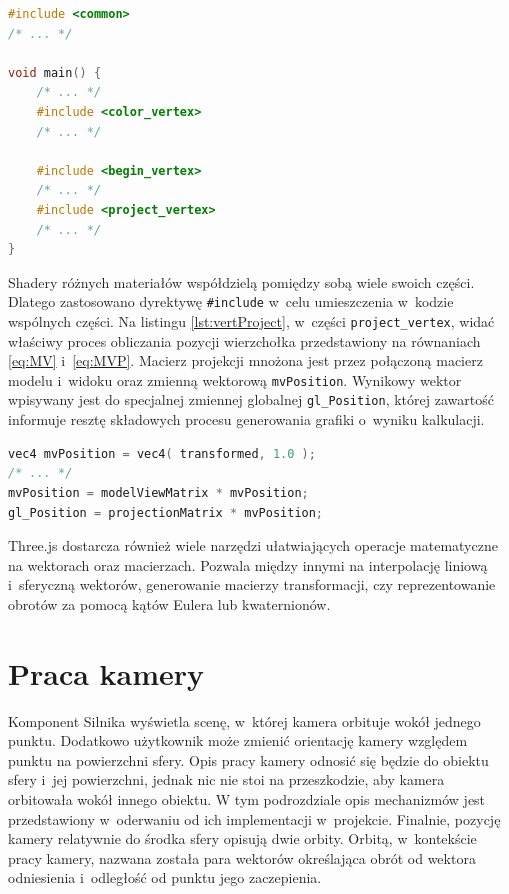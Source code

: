 \begin{lstlisting}[language=C++, label={lst:matVert}, caption={
    Fragmenty vertex shadera materiału \texttt{MeshBasicMaterial}}
]
#include <common>
/* ... */

void main() {
    /* ... */
	#include <color_vertex>
    /* ... */

	#include <begin_vertex>
	/* ... */
	#include <project_vertex>
	/* ... */
}
\end{lstlisting}

Shadery różnych materiałów współdzielą pomiędzy sobą wiele swoich części. Dlatego zastosowano dyrektywę \texttt{\#include} w~celu umieszczenia w~kodzie wspólnych części. Na listingu \ref{lst:vertProject}, w~części \texttt{project\_vertex}, widać właściwy proces obliczania pozycji wierzchołka przedstawiony na równaniach \ref{eq:MV} i~\ref{eq:MVP}. Macierz projekcji mnożona jest przez połączoną macierz modelu i~widoku oraz zmienną wektorową \texttt{mvPosition}. Wynikowy wektor wpisywany jest do specjalnej zmiennej globalnej \texttt{gl\_Position}, której zawartość informuje resztę składowych procesu generowania grafiki o~wyniku kalkulacji. 

\begin{lstlisting}[language=C++, label={lst:vertProject}, caption={
    Fragmenty części \texttt{project\_vertex} vertex shadera}
]
vec4 mvPosition = vec4( transformed, 1.0 );
/* ... */
mvPosition = modelViewMatrix * mvPosition;
gl_Position = projectionMatrix * mvPosition;
\end{lstlisting}

Three.js dostarcza również wiele narzędzi ułatwiających operacje matematyczne na wektorach oraz macierzach. Pozwala między innymi na interpolację liniową i~sferyczną wektorów, generowanie macierzy transformacji, czy reprezentowanie obrotów za pomocą kątów Eulera lub kwaternionów.

\section{Praca kamery}

Komponent Silnika wyświetla scenę, w~której kamera orbituje wokół jednego punktu. Dodatkowo użytkownik może zmienić orientację kamery względem punktu na powierzchni sfery. Opis pracy kamery odnosić się będzie do obiektu sfery i~jej powierzchni, jednak nic nie stoi na przeszkodzie, aby kamera orbitowała wokół innego obiektu. W tym podrozdziale opis mechanizmów jest przedstawiony w~oderwaniu od ich implementacji w~projekcie. Finalnie, pozycję kamery relatywnie do środka sfery opisują dwie orbity. Orbitą, w~kontekście pracy kamery, nazwana została para wektorów określająca obrót od wektora odniesienia i~odległość od punktu jego zaczepienia.

